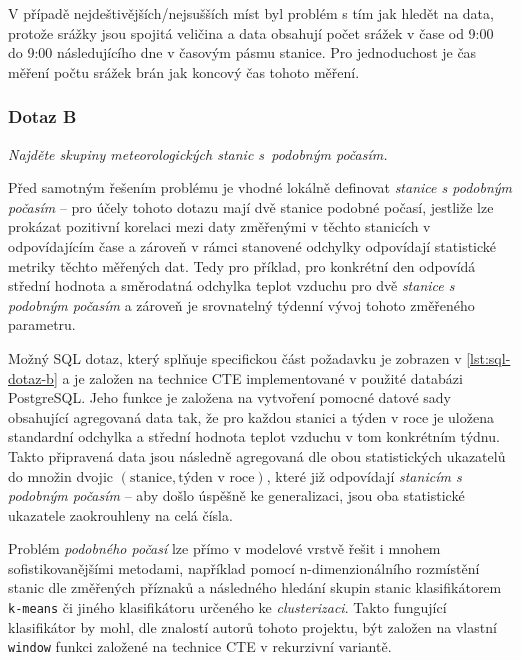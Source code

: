 \documentclass[10pt,a4paper,titlepage]{extarticle}
\begin{document}
    V případě nejdeštivějších/nejsušších míst byl problém s tím jak hledět na data, protože srážky jsou spojitá veličina a data obsahují počet srážek v čase od 9:00 do 9:00 následujícího dne v časovým pásmu stanice. Pro jednoduchost je čas měření počtu srážek brán jak koncový čas tohoto měření. 
    
    \subsubsection{Dotaz B}
    \emph{Najděte skupiny meteorologických stanic s~podobným počasím.}

    Před samotným řešením problému je vhodné lokálně definovat \emph{stanice s podobným počasím} -- pro účely tohoto
    dotazu mají dvě stanice podobné počasí, jestliže lze prokázat pozitivní korelaci mezi daty změřenými v těchto
    stanicích v odpovídajícím čase a zároveň v rámci stanovené odchylky odpovídají statistické metriky těchto
    měřených dat. Tedy pro příklad, pro konkrétní den odpovídá střední hodnota a směrodatná odchylka teplot vzduchu
    pro dvě \emph{stanice s podobným počasím} a zároveň je srovnatelný týdenní vývoj tohoto změřeného parametru.

    Možný SQL dotaz, který splňuje specifickou část požadavku je zobrazen v \ref{lst:sql-dotaz-b} a je založen na
    technice CTE implementované v použité databázi PostgreSQL. Jeho funkce je založena na vytvoření pomocné datové
    sady obsahující agregovaná data tak, že pro každou stanici a týden v roce je uložena standardní odchylka a
    střední hodnota teplot vzduchu v tom konkrétním týdnu. Takto připravená data jsou následně agregovaná dle obou
    statistických ukazatelů do množin dvojic $(\text{stanice}, \text{týden v roce})$, které již odpovídají
    \emph{stanicím s podobným počasím} -- aby došlo úspěšně ke generalizaci, jsou oba statistické ukazatele
    zaokrouhleny na celá čísla.

    Problém \emph{podobného počasí} lze přímo v modelové vrstvě řešit i mnohem sofistikovanějšími
    metodami, například pomocí n-dimenzionálního rozmístění stanic dle změřených příznaků a následného hledání 
    skupin stanic klasifikátorem \texttt{k-means} či jiného klasifikátoru určeného ke \emph{clusterizaci}. Takto
    fungující klasifikátor by mohl, dle znalostí autorů tohoto projektu, být založen na vlastní \texttt{window}
    funkci založené na technice CTE v rekurzivní variantě.
\end{document}

